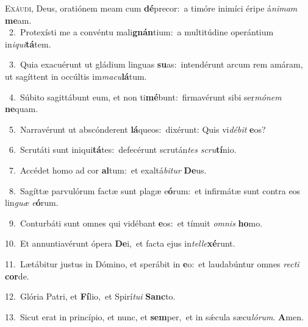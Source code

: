 \lettrine{\initial\textcolor{\initialcolor}{E}}{xáudi,} Deus, oratiónem meam cum \textbf{dé}\-precor:~\star a timóre inimíci éripe á\-\textit{ni}\-\textit{mam} \textbf{me}\-am.\\
{\numbfont\textcolor{\numbcolor}{~2.}}~Protexísti me a convéntu mali\-\textbf{gnán}\-tium:~\star a multitúdine operántium in\-\textit{i}\-\textit{qui}\textbf{tá}tem.\par
{\numbfont\textcolor{\numbcolor}{~3.}}~Quia exacuérunt ut gládium linguas \textbf{su}\-as:~\star intendérunt arcum rem amáram, ut sagíttent in occúltis im\-\textit{ma}\-\textit{cu}\textbf{lá}tum.\par
{\numbfont\textcolor{\numbcolor}{~4.}}~Súbito sagittábunt eum, et non ti\-\textbf{mé}\-bunt:~\star firmavérunt sibi ser\-\textit{mó}\-\textit{nem} \textbf{ne}\-quam.\par
{\numbfont\textcolor{\numbcolor}{~5.}}~Narravérunt ut abscónderent \textbf{lá}\-queos:~\star dixérunt: Quis vi\-\textit{dé}\-\textit{bit} \textbf{e}\-os?\par
{\numbfont\textcolor{\numbcolor}{~6.}}~Scrutáti sunt iniqui\-\textbf{tá}\-tes:~\star defecérunt scrután\textit{tes} \textit{scru}\-\textbf{tí}nio.\par
{\numbfont\textcolor{\numbcolor}{~7.}}~Accédet homo ad cor \textbf{al}\-tum:~\star et exaltá\-\textit{bi}\-\textit{tur} \textbf{De}\-us.\par
{\numbfont\textcolor{\numbcolor}{~8.}}~Sagíttæ parvulórum factæ sunt plagæ e\-\textbf{ó}\-rum:~\star et infirmátæ sunt contra eos lin\textit{guæ} \textit{e}\-\textbf{ó}rum.\par
{\numbfont\textcolor{\numbcolor}{~9.}}~Conturbáti sunt omnes qui vidébant \textbf{e}\-os:~\star et tímuit \textit{om}\-\textit{nis} \textbf{ho}\-mo.\par
{\numbfont\textcolor{\numbcolor}{10.}}~Et annuntiavérunt ópera \textbf{De}\-i,~\star et facta ejus in\-\textit{tel}\-\textit{le}\textbf{xé}runt.\par
{\numbfont\textcolor{\numbcolor}{11.}}~Lætábitur justus in Dómino, et sperábit in \textbf{e}\-o:~\star et laudabúntur omnes \textit{rec}\-\textit{ti} \textbf{cor}\-de.\par
{\numbfont\textcolor{\numbcolor}{12.}}~Glória Patri, et \textbf{Fí}\-lio,~\star et Spirí\-\textit{tu}\-\textit{i} \textbf{Sanc}\-to.\par
{\numbfont\textcolor{\numbcolor}{13.}}~Sicut erat in princípio, et nunc, et \textbf{sem}\-per,~\star et in sǽcula sæcu\-\textit{ló}\-\textit{rum}. \textbf{A}\-men.\par

